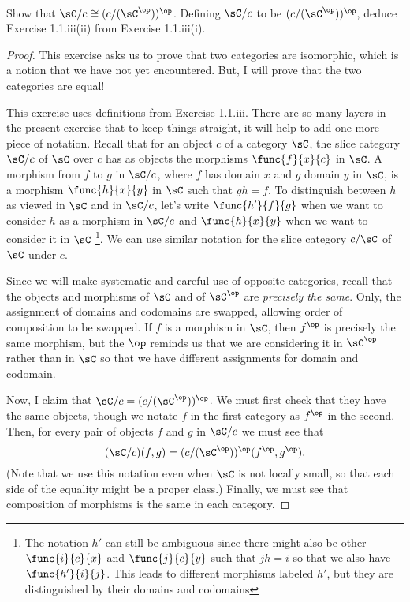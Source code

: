 \documentclass[../../main]{subfiles}
\begin{document}
\paragraph{}
\begin{exercise}
	Show that \(\sC/c\cong(c/(\sC^\op ))^\op\). Defining \(\sC/c\) to be
	\((c/(\sC^\op))^\op\), deduce Exercise 1.1.iii(ii) from Exercise 1.1.iii(i).
\end{exercise}

\begin{proof}
	This exercise asks us to prove that two categories are isomorphic, which is
	a notion that we have not yet encountered. But, I will prove that the two
	categories are equal!

	This exercise uses definitions from Exercise 1.1.iii. There are so many
	layers in the present exercise that to keep things straight, it will help to
	add one more piece of notation. Recall that for an object \(c\) of a
	category \(\sC\), the slice category \(\sC/c\) of \(\sC\) over \(c\) has as
	objects the morphisms \(\func{f}{x}{c}\) in \(\sC\). A morphism from \(f\)
	to \(g\) in \(\sC/c\), where \(f\) has domain \(x\) and \(g\) domain \(y\)
	in \(\sC\), is a morphism \(\func{h}{x}{y}\) in \(\sC\) such that \(gh=f\).
	To distinguish between \(h\) as viewed in \(\sC\) and in \(\sC/c\), let's
	write \(\func{h'}{f}{g}\) when we want to consider \(h\) as a morphism in
	\(\sC/c\) and \(\func{h}{x}{y}\) when we want to consider it in \(\sC\)%
	\footnote{The notation \(h'\) can still be ambiguous since there might also
		be other \(\func{i}{c}{x}\) and \(\func{j}{c}{y}\) such that \(jh=i\) so
		that we also have \(\func{h'}{i}{j}\). This leads to different morphisms
		labeled \(h'\), but they are distinguished by their domains and
	codomains}. We can use similar notation for the slice category \(c/\sC\) of
	\(\sC\) under \(c\).

	Since we will make systematic and careful use of opposite categories, recall
	that the objects and morphisms of \(\sC\) and of \(\sC^\op\) are
	\emph{precisely the same}. Only, the assignment of domains and codomains are
	swapped, allowing order of composition to be swapped. If \(f\) is a morphism
	in \(\sC\), then \(f^\op\) is precisely the same morphism, but the \(\op\)
	reminds us that we are considering it in \(\sC^\op\) rather than in \(\sC\)
	so that we have different assignments for domain and codomain.

	Now, I claim that \(\sC/c=(c/(\sC^\op))^\op\). We must first check that they
	have the same objects, though we notate \(f\) in the first category as
	\(f^\op\) in the second. Then, for every pair of objects \(f\) and \(g\) in
	\(\sC/c\) we must see that \[(\sC/c)(f,g)=(c/(\sC^\op))^\op(f^\op, g^\op).\]
	(Note that we use this notation even when \(\sC\) is not locally small, so
	that each side of the equality might be a proper class.) Finally, we must
	see that composition of morphisms is the same in each category.


\end{proof}
\end{document}
